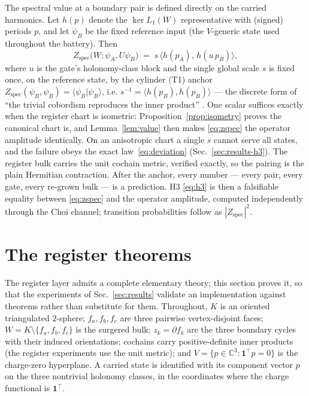 \documentclass[a4paper,twocolumn,11pt,unpublished]{quantumarticle}
\theoremstyle{plain}
\theoremstyle{remark}
\newcommand{\braket}[2]{\langle#1|#2\rangle}
\newcommand{\Zspec}{Z_{\mathrm{spec}}}
\newcommand{\kerL}{\ker L}
\begin{document}
The spectral value at a boundary pair is defined directly on the carried
harmonics. Let $h(p)$ denote the $\kerL_1(W)$ representative with
(signed) periods $p$, and let $\psi_B$ be the fixed reference input (the
$V$-generic state used throughout the battery). Then
\begin{equation}
  \Zspec\bigl(W;\psi_A,U\psi_B\bigr)
  \;=\;
  s\,\bigl\langle h(p_A),\,h(u\,p_B)\bigr\rangle,
  \label{eq:zspec}
\end{equation}
where $u$ is the gate's holonomy-class block and the single global scale
$s$ is fixed once, on the reference state, by the cylinder (T1) anchor
$\Zspec(\psi_B,\psi_B)=\braket{\psi_B}{\psi_B}$, i.e.
$s^{-1}=\langle h(p_B),h(p_B)\rangle$ --- the discrete form of ``the
trivial cobordism reproduces the inner product'' \cite{Atiyah1988TQFT}.
One scalar suffices exactly when the register chart is isometric:
Proposition~\ref{prop:isometry} proves the canonical chart is, and
Lemma~\ref{lem:value} then makes \eqref{eq:zspec} the operator amplitude
identically. On an anisotropic chart a single $s$ cannot serve all
states, and the failure obeys the exact law~\eqref{eq:deviation}
(Sec.~\ref{sec:results-h3}). The register bulk carries the unit cochain
metric, verified exactly, so the pairing is the plain Hermitian
contraction. After the anchor, every number --- every pair, every gate,
every re-grown bulk --- is a prediction. H3 \eqref{eq:h3} is then a
falsifiable equality between \eqref{eq:zspec} and the operator amplitude,
computed independently through the Choi channel; transition probabilities
follow as $|\Zspec|^2$.

\section{The register theorems}
\label{sec:theorems}

The register layer admits a complete elementary theory; this section
proves it, so that the experiments of Sec.~\ref{sec:results} validate an
implementation against theorems rather than substitute for them.
Throughout, $K$ is an oriented triangulated $2$-sphere; $f_a,f_b,f_c$ are
three pairwise vertex-disjoint faces; $W=K\setminus\{f_a,f_b,f_c\}$ is
the surgered bulk; $z_k=\partial f_k$ are the three boundary cycles with
their induced orientations; cochains carry positive-definite inner
products (the register experiments use the unit metric); and
$V=\{p\in\mathbb{C}^3:\mathbf{1}^\top p=0\}$ is the charge-zero
hyperplane. A carried state is identified with its component vector $p$
on the three nontrivial holonomy classes, in the coordinates where the
charge functional is $\mathbf{1}^\top$.
\end{document}
